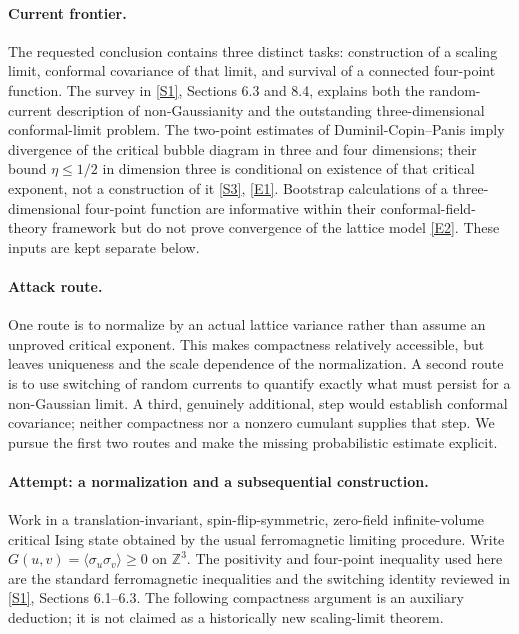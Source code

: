 \documentclass[11pt,a4paper]{article}
\newcommand{\Z}{\mathbb{Z}}
\newcommand{\sref}[2]{\hyperlink{source:#1:#2}{[S#2]}}
\newcommand{\eref}[2]{\hyperlink{extra:#1:#2}{[E#2]}}
\numberwithin{equation}{section}
\begin{document}
\paragraph{Current frontier.}
The requested conclusion contains three distinct tasks: construction of a
scaling limit, conformal covariance of that limit, and survival of a connected
four-point function. The survey in \sref{42}{1}, Sections 6.3 and 8.4, explains
both the random-current description of non-Gaussianity and the outstanding
three-dimensional conformal-limit problem. The two-point estimates of
Duminil-Copin--Panis imply divergence of the critical bubble diagram in
three and four dimensions; their bound $\eta\le 1/2$ in dimension three is
conditional on existence of that critical exponent, not a construction of
it \sref{42}{3}, \eref{42}{1}. Bootstrap calculations of a three-dimensional
four-point function are informative within their conformal-field-theory
framework but do not prove convergence of the lattice model
\eref{42}{2}. These inputs are kept separate below.

\paragraph{Attack route.}
One route is to normalize by an actual lattice variance rather than assume
an unproved critical exponent. This makes compactness relatively accessible,
but leaves uniqueness and the scale dependence of the normalization.
A second route is to use switching of random currents to quantify exactly
what must persist for a non-Gaussian limit. A third, genuinely additional,
step would establish conformal covariance; neither compactness nor a
nonzero cumulant supplies that step. We pursue the first two routes and
make the missing probabilistic estimate explicit.

\paragraph{Attempt: a normalization and a subsequential construction.}
Work in a translation-invariant, spin-flip-symmetric, zero-field infinite-volume
critical Ising state obtained by the usual ferromagnetic limiting procedure.
Write $G(u,v)=\langle\sigma_u\sigma_v\rangle\ge0$ on $\Z^3$.
The positivity and four-point inequality used here are the standard
ferromagnetic inequalities and the switching identity reviewed in
\sref{42}{1}, Sections 6.1--6.3. The following compactness argument is an
auxiliary deduction; it is not claimed as a historically new scaling-limit
theorem.
\end{document}
